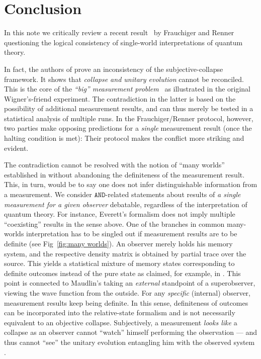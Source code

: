 \documentclass[aps,pra,twocolumn]{revtex4-1}
\newcommand{\AND}{\mathtt{AND}}
\theoremstyle{definition}
\theoremstyle{remark}
\begin{document}
 \section{Conclusion}
\noindent
In this note we critically review a recent result~\cite{FrRen} by Frauchiger and Renner questioning the logical consistency of single-world interpretations of quantum theory.

In fact, the authors of \cite{FrRen} prove an inconsistency of the subjective-collapse framework.
It shows that \emph{collapse and unitary evolution} cannot be reconciled. 
This is the core of the \emph{``big'' measurement problem}~\cite{brukner2015quantum} as illustrated in the original Wigner's-friend experiment.
The contradiction in the latter is based on the possibility of additional measurement results, and can thus merely be tested in a statistical analysis of multiple runs.
In the Frauchiger/Renner protocol, however, two parties make opposing predictions for a \emph{single} measurement result (once the halting condition is met):
Their protocol makes the conflict more striking and evident.

The contradiction cannot be resolved with the notion of ``many worlds'' established in \cite{FrRen} without abandoning the definiteness of the measurement result. 
This, in turn, would be to say one does not infer distinguishable information from a measurement. 
We consider $\AND$-related statements about results of \emph{a single measurement for a given observer} debatable, regardless of the interpretation of quantum theory. 
For instance, Everett's formalism does not imply multiple ``coexisting'' results in the sense above.
One of the branches in common many-worlds interpretation has to be singled out if measurement results are to be definite (see Fig~\ref{fig:many worlds}).
An observer merely holds his memory system, and the respective density matrix is obtained by partial trace over the source. This yields a statistical mixture of memory states corresponding to definite outcomes instead of the pure state as claimed, for example, in \cite{Maudlin95}.  
This point is connected to Maudlin's taking an \emph{external} standpoint of a superobserver, viewing the wave function from the outside.
For any \emph{specific} (internal) observer, measurement results keep being definite.
In this sense, definiteness of outcomes can be incorporated into the relative-state formalism and is not necessarily equivalent to an objective collapse.
Subjectively, a measurement \emph{looks like} a collapse as an observer cannot ``watch'' himself performing the observation --- and thus cannot ``see'' the unitary evolution entangling him with the observed system \cite{filan2015would}. 
\end{document}

